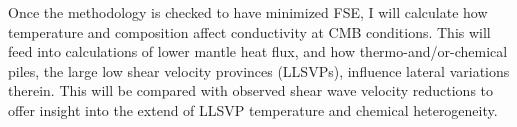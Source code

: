 Once the methodology is checked to have minimized FSE, I will calculate how temperature and composition affect \bdgs conductivity at CMB conditions. This will feed into calculations of lower mantle heat flux, and how thermo-and/or-chemical piles, the large low shear velocity provinces (LLSVPs), influence lateral variations therein. This will be compared with observed shear wave velocity reductions to offer insight into the extend of LLSVP temperature and chemical heterogeneity.












